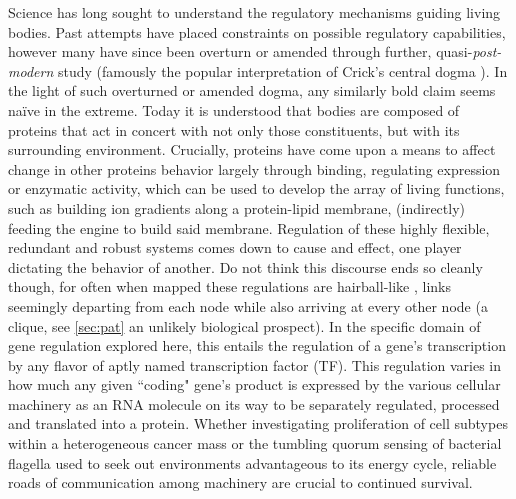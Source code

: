Science has long sought to understand the regulatory mechanisms guiding living bodies. Past attempts have placed constraints on possible regulatory capabilities, however many have since been overturn or amended through further, quasi-\emph{post-modern} study (famously the popular interpretation of Crick's central dogma \citep{crick1958protein}). In the light of such overturned or amended dogma, any similarly bold claim seems na\"{i}ve in the extreme. Today it is understood that bodies are composed of proteins that act in concert with not only those constituents, but with its surrounding environment. Crucially, proteins have come upon a means to affect change in other proteins behavior largely through binding, \eg regulating expression or enzymatic activity, which can be used to develop the array of living functions, such as building ion gradients along a protein-lipid membrane, (indirectly) feeding the engine to build said membrane. Regulation of these highly flexible, redundant and robust systems comes down to cause and effect, \ie one player dictating the behavior of another. Do not think this discourse ends so cleanly though, for often when mapped these regulations are hairball-like \citep{schulz2013grooming}, links seemingly departing from each node while also arriving at every other node (\ie a clique, see \cref{sec:pat} an unlikely biological prospect). In the specific domain of gene regulation explored here, this entails the regulation of a gene's transcription by any flavor of aptly named transcription factor (TF). This regulation varies in how much any given ``coding" gene's product is expressed by the various cellular machinery as an RNA molecule on its way to be separately regulated, processed and translated into a protein. Whether investigating proliferation of cell subtypes within a heterogeneous cancer mass \citep{weinberg1996cancer} or the tumbling quorum sensing of bacterial flagella used to seek out environments advantageous to its energy cycle, reliable roads of communication among machinery are crucial to continued survival.

